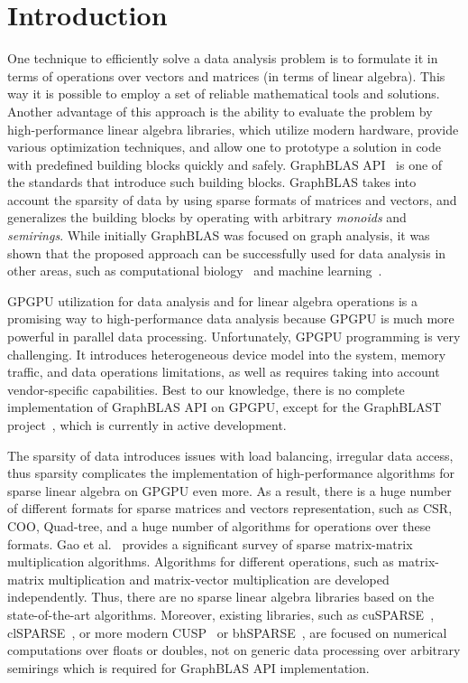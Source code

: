 \section{Introduction}

One technique to efficiently solve a data analysis problem is to formulate it in terms of operations over vectors and matrices (in terms of linear algebra).
This way it is possible to employ a set of reliable mathematical tools and solutions.
Another advantage of this approach is the ability to evaluate the problem by high-performance linear algebra libraries, which utilize modern hardware, provide various optimization techniques, and allow one to prototype a solution in code with predefined building blocks quickly and safely.
GraphBLAS API~\cite{7761646} %
is one of the standards that introduce such building blocks.
GraphBLAS takes into account the sparsity of data by using sparse formats of matrices and vectors, and generalizes the building blocks by operating with arbitrary \textit{monoids} and \textit{semirings}.
While initially GraphBLAS was focused on graph analysis, it was shown that the proposed approach can be successfully used for data analysis in other areas, such as computational biology~\cite{10.5555/3433701.3433800} and machine learning~\cite{8091098}.

GPGPU utilization for data analysis and for linear algebra operations is a promising way to high-performance data analysis because GPGPU is much more powerful in parallel data processing.
Unfortunately, GPGPU programming is very challenging.
It introduces heterogeneous device model into the system, memory traffic, and data operations limitations, as well as requires taking into account vendor-specific capabilities.
Best to our knowledge, there is no complete implementation of GraphBLAS API on GPGPU, except for the GraphBLAST project~\cite{yang2019graphblast}, %
which is currently in active development.

The sparsity of data introduces issues with load balancing, irregular data access, thus sparsity complicates the implementation of high-performance algorithms for sparse linear algebra on GPGPU even more.
As a result, there is a huge number of different formats for sparse matrices and vectors representation, such as CSR, COO, Quad-tree, and a huge number of algorithms for operations over these formats.
Gao et al.~\cite{Gao2020ASS} provides a significant survey of sparse matrix-matrix multiplication algorithms.
Algorithms for different operations, such as matrix-matrix multiplication and matrix-vector multiplication are developed independently.
Thus, there are no sparse linear algebra libraries based on the state-of-the-art algorithms.
Moreover, existing libraries, such as cuSPARSE~\cite{lib:cuSPARSE}, clSPARSE~\cite{10.1145/2909437.2909442}, or more modern CUSP~\cite{lib:cusp} or bhSPARSE~\cite{10.1016/j.jpdc.2015.06.010}, are focused on numerical computations over floats or doubles, not on generic data processing over arbitrary semirings which is required for GraphBLAS API implementation.

